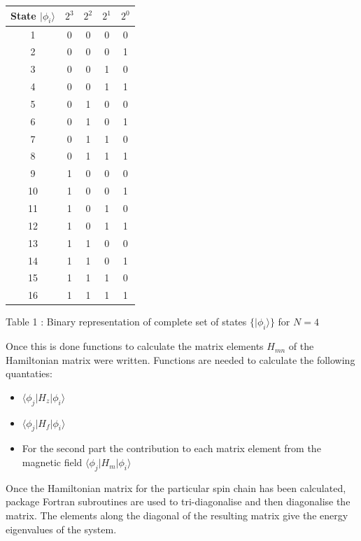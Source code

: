 \documentclass[a4paper]{IEEEtran}
\begin{document}
    \begin{table}
    \begin{center}
        \begin{tabular}{|c||c|c|c|c|} \hline
        State $|\phi_i\rangle$ & $2^3$ & $2^2$ & $2^1$ & $2^0$ \\ \hline \hline
        1 & 0 & 0 & 0 & 0 \\ \hline 
        2 & 0 & 0 & 0 & 1 \\ \hline
        3 & 0 & 0 & 1 & 0 \\ \hline
        4 & 0 & 0 & 1 & 1 \\ \hline
        5 & 0 & 1 & 0 & 0 \\ \hline
        6 & 0 & 1 & 0 & 1 \\ \hline
        7 & 0 & 1 & 1 & 0 \\ \hline
        8 & 0 & 1 & 1 & 1 \\ \hline
        9 & 1 & 0 & 0 & 0 \\ \hline
       10 & 1 & 0 & 0 & 1 \\ \hline
       11 & 1 & 0 & 1 & 0 \\ \hline
       12 & 1 & 0 & 1 & 1 \\ \hline
       13 & 1 & 1 & 0 & 0 \\ \hline
       14 & 1 & 1 & 0 & 1 \\ \hline
       15 & 1 & 1 & 1 & 0 \\ \hline
       16 & 1 & 1 & 1 & 1 \\ \hline
       \end{tabular}
       \vspace{1mm}
       \begin{center}
       Table 1 : Binary representation of complete set of states $\{|\phi_i\rangle\}$
       for $N=4$
       \end{center}
    \end{center}
    \end{table} 

    Once this is done functions to calculate the matrix elements $H_{mn}$ of the Hamiltonian
    matrix were written. Functions are needed to calculate the following quantaties:
    \begin{itemize}
        \item $\langle\phi_j|H_z|\phi_i\rangle$
        \item $\langle\phi_j|H_f|\phi_i\rangle$
        \item For the second part the contribution to each matrix element from the
              magnetic field $\langle\phi_j|H_m|\phi_i\rangle$
    \end{itemize}
    Once the Hamiltonian matrix for the particular spin chain has been calculated,
    package Fortran subroutines are used to tri-diagonalise and then diagonalise 
    the matrix. The elements along the diagonal of the resulting matrix give the
    energy eigenvalues of the system.
\end{document}
